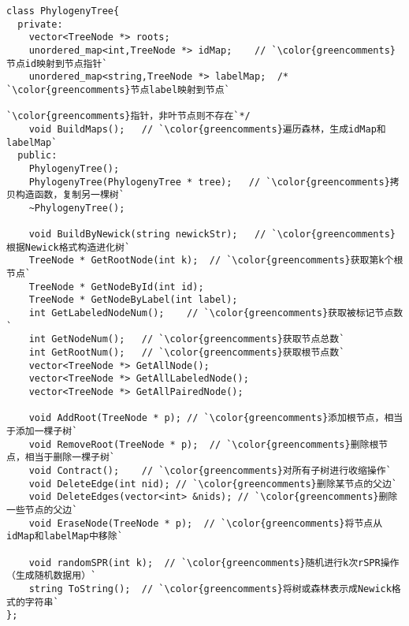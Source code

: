 
\begin{CJK}{UTF8}{gbsn}
\begin{lstlisting}
class PhylogenyTree{    
  private:
    vector<TreeNode *> roots;
    unordered_map<int,TreeNode *> idMap;    // `\color{greencomments}节点id映射到节点指针`
    unordered_map<string,TreeNode *> labelMap;  /* `\color{greencomments}节点label映射到节点`
                                                 `\color{greencomments}指针，非叶节点则不存在`*/
    void BuildMaps();   // `\color{greencomments}遍历森林，生成idMap和labelMap`
  public:
    PhylogenyTree();
    PhylogenyTree(PhylogenyTree * tree);   // `\color{greencomments}拷贝构造函数，复制另一棵树`
    ~PhylogenyTree();

    void BuildByNewick(string newickStr);   // `\color{greencomments}根据Newick格式构造进化树`
    TreeNode * GetRootNode(int k);  // `\color{greencomments}获取第k个根节点`
    TreeNode * GetNodeById(int id);
    TreeNode * GetNodeByLabel(int label);
    int GetLabeledNodeNum();    // `\color{greencomments}获取被标记节点数`
    int GetNodeNum();   // `\color{greencomments}获取节点总数`
    int GetRootNum();   // `\color{greencomments}获取根节点数`
    vector<TreeNode *> GetAllNode();    
    vector<TreeNode *> GetAllLabeledNode();
    vector<TreeNode *> GetAllPairedNode();

    void AddRoot(TreeNode * p); // `\color{greencomments}添加根节点，相当于添加一棵子树`
    void RemoveRoot(TreeNode * p);  // `\color{greencomments}删除根节点，相当于删除一棵子树`
    void Contract();    // `\color{greencomments}对所有子树进行收缩操作`
    void DeleteEdge(int nid); // `\color{greencomments}删除某节点的父边`
    void DeleteEdges(vector<int> &nids); // `\color{greencomments}删除一些节点的父边`
    void EraseNode(TreeNode * p);  // `\color{greencomments}将节点从idMap和labelMap中移除`
    
    void randomSPR(int k);  // `\color{greencomments}随机进行k次rSPR操作（生成随机数据用）`
    string ToString();  // `\color{greencomments}将树或森林表示成Newick格式的字符串`
};

\end{lstlisting}
\end{CJK}